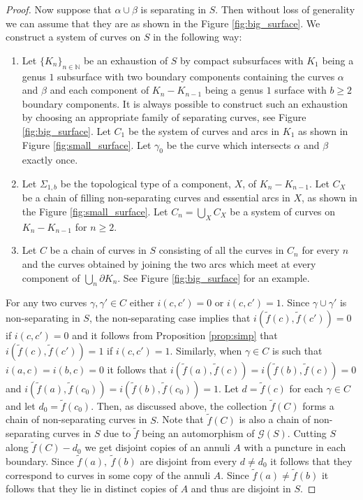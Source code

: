 \documentclass[11pt]{article}
\def\N{\mathbb{N}}
\def\a{\alpha}
\def\b{\beta}
\def\g{\gamma}
\begin{document}
\begin{proof}
  Now suppose that $\a \cup \b$ is separating in $S$. Then without loss of generality we can assume that they are as shown in the Figure \ref{fig:big_surface}. We construct a system of curves on $S$ in the following way:
  \begin{enumerate}
    \item Let $\{K_n\}_{n\in \N}$ be an exhaustion of $S$ by compact subsurfaces with $K_1$ being a genus $1$ subsurface with two boundary components containing the curves $\a$ and $\b$ and each component of $K_n - K_{n-1}$ being a genus $1$ surface with $b\geq 2$ boundary components. It is always possible to construct such an exhaustion by choosing an appropriate family of separating curves, see Figure \ref{fig:big_surface}. Let $C_1$ be the system of curves and arcs in $K_1$ as shown in Figure \ref{fig:small_surface}. Let $\g_0$ be the curve which intersects $\a$ and $\b$ exactly once.
    \item Let $\Sigma_{1,b}$ be the topological type of a component, $X$, of $K_{n}- K_{n-1}$. Let $C_X$ be a chain of filling non-separating curves and essential arcs in $X$, as shown in the Figure \ref{fig:small_surface}. Let $C_n = \bigcup_X C_X$ be a system of curves on $K_n-K_{n-1}$ for $n\geq 2$.
    \item Let $C$ be a chain of curves in $S$ consisting of all the curves in $C_n$ for every $n$ and the curves obtained by joining the two arcs which meet at every component of $\bigcup_n\partial K_n$. See Figure \ref{fig:big_surface} for an example.
  \end{enumerate}
  For any two curves $\g, \g'\in C$ either $i(c, c') = 0$ or $i(c,c') = 1$. Since $\g\cup \g'$ is non-separating in $S$, the non-separating case implies that $i(\tilde{f}(c), \tilde{f}(c'))=0$ if $i(c,c')=0$ and it follows from Proposition \ref{prop:simp} that $i(\tilde{f}(c), \tilde{f}(c')) = 1$ if $i(c,c')=1$. Similarly, when $\g\in C$ is such that $i(a,c) = i(b,c) = 0$ it follows that $i(\tilde{f}(a), \tilde{f}(c)) = i(\tilde{f}(b), \tilde{f}(c)) = 0$ and $i(\tilde{f}(a), \tilde{f}(c_0)) = i(\tilde{f}(b), \tilde{f}(c_0)) = 1$. Let $d = \tilde{f}(c)$ for each $\g \in C$ and let $d_0 = \tilde{f}(c_0)$. Then, as discussed above, the collection $\tilde{f}(C)$ forms a chain of non-separating curves in $S$. Note that $\tilde{f}(C)$ is also a chain of non-separating curves in $S$ due to $\tilde{f}$ being an automorphism of $ \mathcal{G}(S)$. Cutting $S$ along $\tilde{f}(C)-d_0$ we get disjoint copies of an annuli $A$ with a puncture in each boundary. Since $\tilde{f}(a),\ \tilde{f}(b)$ are disjoint from every $d\neq d_0$ it follows that they correspond to curves in some copy of the annuli $A$. Since $\tilde{f}(a)\neq \tilde{f}(b)$ it follows that they lie in distinct copies of $A$ and thus are disjoint in $S$.
\end{proof}
\end{document}
